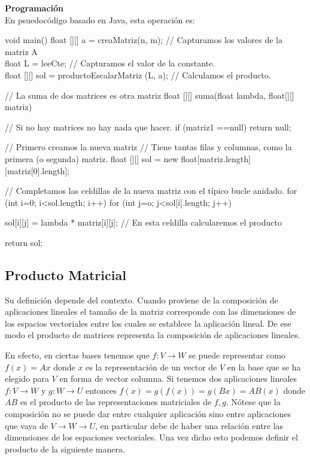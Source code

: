 \noindent\textbf{Programación} \\

En psuedocódigo basado en Java, esta operación es:

\begin{code}[caption=Suma de Matrices, label=default]
void main() {
  float [][] a = creaMatriz(n, m); // Capturamos los valores de la matriz A \\
  float L = leeCte; // Capturamos el valor de la constante. \\
  float [][] sol = productoEscalarMatriz (L, a); // Calculamos el producto. \\
} 

// La suma de dos matrices es otra matriz
float [][] suma(float lambda, float[][] matriz) {
   // Si no hay matrices no hay nada que hacer.
   if (matriz1 ==null) return null;
   
   // Primero creamos la nueva matriz
   // Tiene tantas filas y columnas, como la primera (o segunda) matriz.
   float [][] sol = new float[matriz.length][matriz[0].length];
   
   // Completamos las celdillas de la nueva matriz con el típico bucle anidado.
   for (int i=0; i<sol.length; i++)
     for (int j=o; j<sol[i].length; j++)
     
       sol[i][j] = lambda * matriz[i][j]; // En esta celdilla calcularemos el producto
       
   return sol;
}    
\end{code}
\subsection{Producto Matricial}

Su definición depende del contexto. Cuando proviene de la composición de aplicaciones lineales el tamaño de la matriz corresponde con las dimensiones de los espacios vectoriales entre los cuales se establece la aplicación lineal. De ese modo el producto de matrices representa la composición de aplicaciones lineales.

En efecto, en ciertas bases tenemos que $f : V \longrightarrow W$ se puede representar como $f(x) = Ax$ donde $x$ es la representación de un vector de $V$ en la base que se ha elegido para $V$ en forma de vector columna. Si tenemos dos aplicaciones lineales $f : V \longrightarrow W$ y $g : W \longrightarrow U$ entonces $f(x) = g(f(x)) = g(Bx) = AB(x)$ donde $AB$ es el producto de las representaciones matriciales de $f, g$. Nótese que la composición no se puede dar entre cualquier aplicación sino entre aplicaciones que vaya de $V \rightarrow W \rightarrow U$, en particular debe de haber una relación entre las dimensiones de los espaciones vectoriales. Una vez dicho esto podemos definir el producto de la siguiente manera. \\

